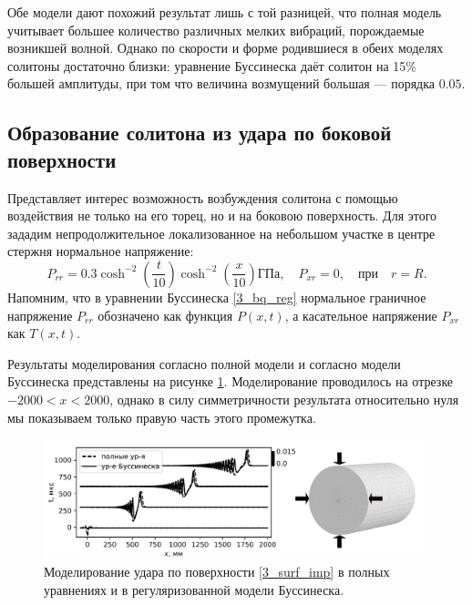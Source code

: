 \documentclass[12pt, a4paper]{report}
\newcommand{\lb}{\left (}
\newcommand{\rb}{\right )}
\begin{document}
Обе модели дают похожий результат лишь с той разницей, что полная модель учитывает большее количество различных мелких вибраций, порождаемые возникшей волной. Однако по скорости и форме родившиеся в обеих моделях солитоны достаточно близки: уравнение Буссинеска даёт солитон на 15\% большей амплитуды, при том что величина возмущений большая --- порядка $0.05$.


\subsection{Образование солитона из удара по боковой поверхности}
Представляет интерес возможность возбуждения солитона с помощью воздействия не только на его торец, но и на боковою поверхность. Для этого зададим непродолжительное локализованное на небольшом участке в центре стержня нормальное напряжение:
\begin{equation}\label{3_surf_imp}
P_{rr} = 0.3 \cosh^{-2}\lb\frac{t}{10}\rb \cosh^{-2}\lb\frac{x}{10}\rb\mbox{ГПа}, \quad P_{xr} = 0, \quad \mbox{при} \quad r=R.
\end{equation}
Напомним, что в уравнении Буссинеска \eqref{3_bq_reg} нормальное граничное напряжение $P_{rr}$ обозначено как функция $P(x,t)$, а касательное напряжение $P_{xr}$ как $T(x,t)$.

Результаты моделирования согласно полной модели и согласно модели Буссинеска представлены на рисунке \ref{fig:surf_impact}. Моделирование проводилось на отрезке $-2000<x<2000$, однако в силу симметричности результата относительно нуля мы показываем только правую часть этого промежутка. 
\begin{figure}[h]
	\centering
	\includegraphics[width=\linewidth]{figures/SurfImpact}
	\caption{Моделирование удара по поверхности \eqref{3_surf_imp} в полных уравнениях и в регуляризованной модели Буссинеска.}
	\label{fig:surf_impact}
\end{figure}
\end{document}
